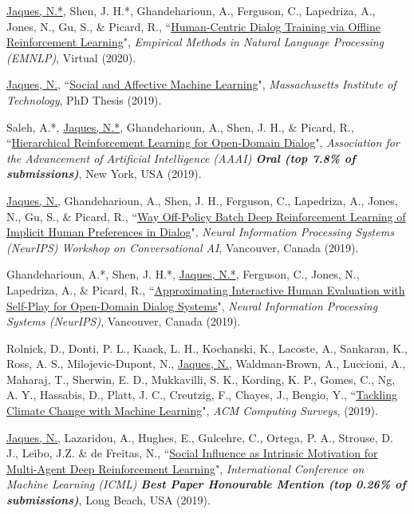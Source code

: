 \documentclass[paper=letter,fontsize=11pt]{scrartcl} %
\newcommand{\PaperEntry}[6]{
        \noindent #1, ``\href{#6}{#2}", \textit{#3}, #4 (#5).}
\begin{document}
\begin{etaremune}
\item \PaperEntry{\underline{Jaques, N.*}, Shen, J. H.*, Ghandeharioun, A., Ferguson, C., Lapedriza, A., Jones, N., Gu, S., \& Picard, R.}{Human-Centric Dialog Training via Offline Reinforcement Learning}{Empirical Methods in Natural Language Processing (EMNLP)}{Virtual}{2020}{https://arxiv.org/pdf/2010.05848.pdf}

\item \PaperEntry{\underline{Jaques, N.}}{Social and Affective Machine Learning}{Massachusetts Institute of Technology}{PhD Thesis}{2019}{https://www.media.mit.edu/publications/social-and-affective-machine-learning/}

\item \PaperEntry{Saleh, A.*, \underline{Jaques, N.*}, Ghandeharioun, A., Shen, J. H., \& Picard, R.}{Hierarchical Reinforcement Learning for Open-Domain Dialog}{Association for the Advancement of Artificial Intelligence (AAAI) \textbf{Oral (top 7.8\% of submissions)}}{New York, USA}{2019}{https://arxiv.org/abs/1909.07547}

\item \PaperEntry{\underline{Jaques, N.}, Ghandeharioun, A., Shen, J. H., Ferguson, C., Lapedriza, A., Jones, N., Gu, S., \& Picard, R.}{Way Off-Policy Batch Deep Reinforcement Learning of Implicit Human Preferences in Dialog}{Neural Information Processing Systems (NeurIPS) Workshop on Conversational AI}{Vancouver, Canada}{2019}{https://arxiv.org/abs/1907.00456}

\item \PaperEntry{Ghandeharioun, A.*, Shen, J. H.*, \underline{Jaques, N.*}, Ferguson, C., Jones, N., Lapedriza, A., \& Picard, R.}{Approximating Interactive Human Evaluation with Self-Play for Open-Domain Dialog Systems}{Neural Information Processing Systems (NeurIPS)}{Vancouver, Canada}{2019}{https://arxiv.org/abs/1906.09308}

\item \PaperEntry{Rolnick, D., Donti, P. L., Kaack, L. H., Kochanski, K., Lacoste, A., Sankaran, K., Ross, A. S., Milojevic-Dupont, N., \underline{Jaques, N.}, Waldman-Brown, A., Luccioni, A., Maharaj, T., Sherwin, E. D., Mukkavilli, S. K., Kording, K. P., Gomes, C., Ng, A. Y., Hassabis, D., Platt, J. C., Creutzig, F., Chayes, J., Bengio, Y.}{Tackling Climate Change with Machine Learning}{ACM Computing Surveys}{}{2019}{https://arxiv.org/abs/1906.05433}

\item \PaperEntry{\underline{Jaques, N.}, Lazaridou, A., Hughes, E., Gulcehre, C., Ortega, P. A., Strouse, D. J., Leibo, J.Z. \& de Freitas, N.}{Social Influence as Intrinsic Motivation for Multi-Agent Deep Reinforcement Learning}{International Conference on Machine Learning (ICML) \textbf{Best Paper Honourable Mention (top 0.26\% of submissions)}}{Long Beach, USA}{2019}{https://arxiv.org/pdf/1810.08647.pdf}


\end{etaremune}
\end{document}
